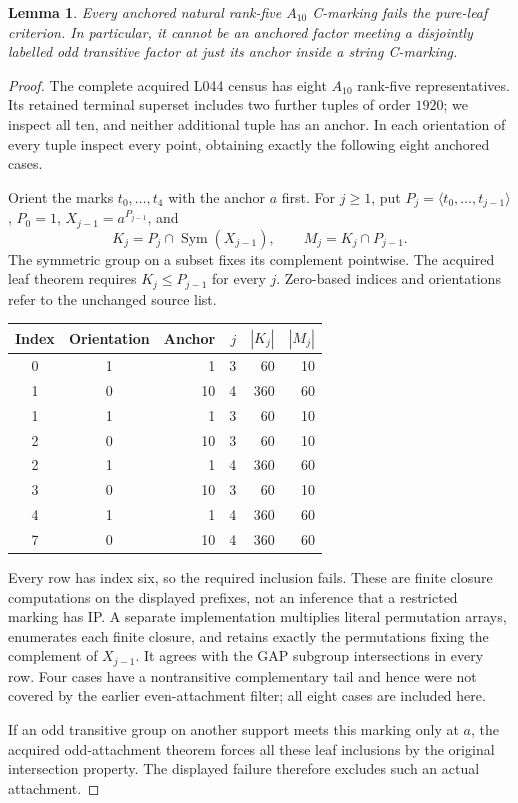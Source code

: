\documentclass[11pt,a4paper]{article}
\newtheorem{lemma}{Lemma}
\newcommand{\gen}[1]{\langle#1\rangle}
\newcommand{\Sym}{\operatorname{Sym}}
\begin{document}
\begin{lemma}\label{ten}
Every anchored natural rank-five $A_{10}$ C-marking fails the pure-leaf
criterion. In particular, it cannot be an anchored factor meeting a
disjointly labelled odd transitive factor at just its anchor inside
a string C-marking.
\end{lemma}
\begin{proof}
The complete acquired L044 census has eight $A_{10}$ rank-five
representatives. Its retained terminal superset includes two further
tuples of order $1920$; we inspect all ten, and neither additional
tuple has an anchor. In each orientation of every tuple inspect every
point, obtaining exactly the following eight anchored cases.

Orient the marks $t_0,\ldots,t_4$ with the anchor $a$ first. For
$j\ge1$, put $P_j=\gen{t_0,\ldots,t_{j-1}}$, $P_0=1$,
$X_{j-1}=a^{P_{j-1}}$, and
\[
 K_j=P_j\cap\Sym(X_{j-1}),\qquad M_j=K_j\cap P_{j-1}.
\]
The symmetric group on a subset fixes its complement pointwise.
The acquired leaf theorem requires $K_j\le P_{j-1}$ for every $j$.
Zero-based indices and orientations refer to the unchanged source list.
\begin{center}
\begin{tabular}{ccrrrr}
\toprule
Index&Orientation&Anchor&$j$&$|K_j|$&$|M_j|$\\
\midrule
0&1&1&3&60&10\\
1&0&10&4&360&60\\
1&1&1&3&60&10\\
2&0&10&3&60&10\\
2&1&1&4&360&60\\
3&0&10&3&60&10\\
4&1&1&4&360&60\\
7&0&10&4&360&60\\
\bottomrule
\end{tabular}
\end{center}
Every row has index six, so the required inclusion fails. These are
finite closure computations on the displayed prefixes, not an inference
that a restricted marking has IP. A separate implementation multiplies
literal permutation arrays, enumerates each finite closure, and retains
exactly the permutations fixing the complement of $X_{j-1}$. It agrees
with the GAP subgroup intersections in every row. Four cases have a
nontransitive complementary tail and hence were not covered by the
earlier even-attachment filter; all eight cases are included here.

If an odd transitive group on another support meets this marking only
at $a$, the acquired odd-attachment theorem forces all these leaf
inclusions by the original intersection property. The displayed failure
therefore excludes such an actual attachment.
\end{proof}
\end{document}
